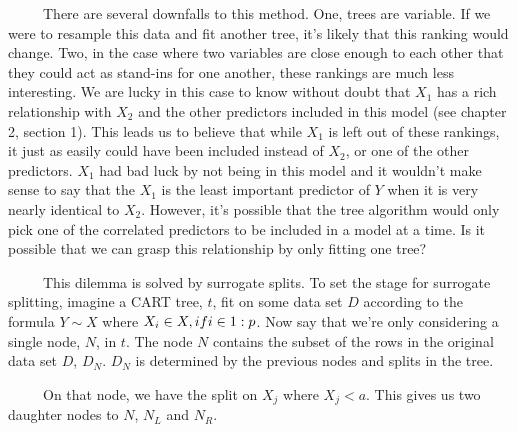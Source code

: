\documentclass[12pt,twoside]{reedthesis}
\begin{document}
  ~~~~~There are several downfalls to this method. One, trees are
  variable. If we were to resample this data and fit another tree, it's
  likely that this ranking would change. Two, in the case where two
  variables are close enough to each other that they could act as
  stand-ins for one another, these rankings are much less interesting. We
  are lucky in this case to know without doubt that \(X_1\) has a rich
  relationship with \(X_2\) and the other predictors included in this
  model (see chapter 2, section 1). This leads us to believe that while
  \(X_1\) is left out of these rankings, it just as easily could have been
  included instead of \(X_2\), or one of the other predictors. \(X_1\) had
  bad luck by not being in this model and it wouldn't make sense to say
  that the \(X_1\) is the least important predictor of \(Y\) when it is
  very nearly identical to \(X_2\). However, it's possible that the tree
  algorithm would only pick one of the correlated predictors to be
  included in a model at a time. Is it possible that we can grasp this
  relationship by only fitting one tree?
  
  ~~~~~This dilemma is solved by surrogate splits. To set the stage for
  surrogate splitting, imagine a CART tree, \(t\), fit on some data set
  \(D\) according to the formula \(Y \sim X\) where
  \(X_i \in X, \\ if \\ i \in 1:p\). Now say that we're only considering a
  single node, \(N\), in \(t\). The node \(N\) contains the subset of the
  rows in the original data set \(D\), \(D_N\). \(D_N\) is determined by
  the previous nodes and splits in the tree.
  
  \begin{center}
  \end{center}
  
  ~~~~~On that node, we have the split on \(X_j\) where \(X_j < a\). This
  gives us two daughter nodes to \(N\), \(N_L\) and \(N_R\).
  
  \usetikzlibrary{positioning}
  
  \begin{center}
  \end{center}
  
\end{document}
